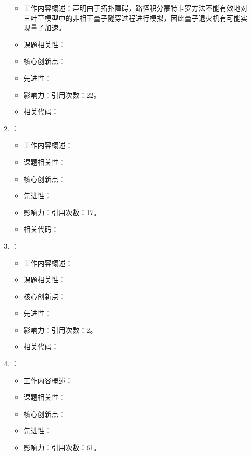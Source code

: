 \begin{enumerate}
            \begin{itemize}
                \item 工作内容概述：声明由于拓扑障碍，路径积分蒙特卡罗方法不能有效地对三叶草模型中的非相干量子隧穿过程进行模拟，因此量子退火机有可能实现量子加速。
                \item 课题相关性：
                \item 核心创新点：
                \item 先进性：
                \item 影响力：引用次数：22。
                \item 相关代码：
            \end{itemize}
        \item \citet{hibat2021variational}：
            \begin{itemize}
                \item 工作内容概述：
                \item 课题相关性：
                \item 核心创新点：
                \item 先进性：
                \item 影响力：引用次数：17。
                \item 相关代码：
            \end{itemize}
            \item \citet{bapat2021approximate}：
            \begin{itemize}
                \item 工作内容概述：
                \item 课题相关性：
                \item 核心创新点：
                \item 先进性：
                \item 影响力：引用次数：2。
                \item 相关代码：
            \end{itemize}
            \item \citet{brady2021optimal}：
            \begin{itemize}
                \item 工作内容概述：
                \item 课题相关性：
                \item 核心创新点：
                \item 先进性：
                \item 影响力：引用次数：61。

\end{itemize}
\end{enumerate}
